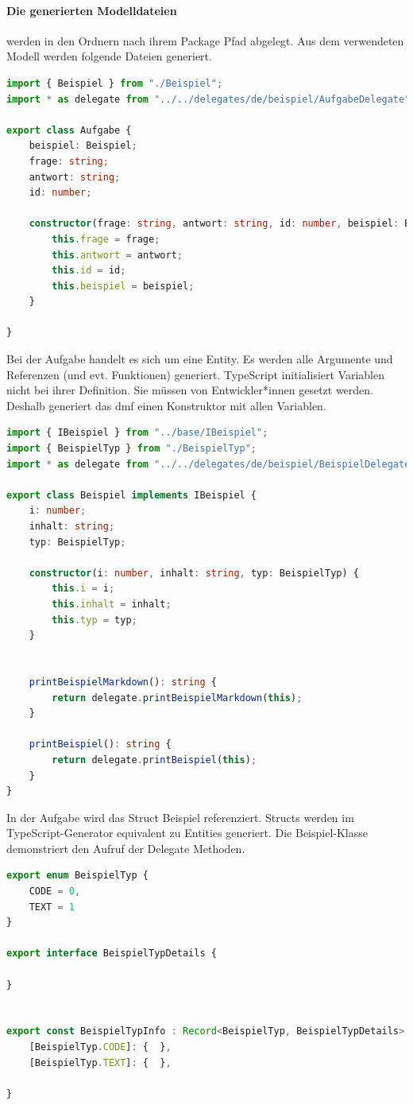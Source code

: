 \documentclass[./einleitung.tex]{subfiles}
\begin{document}
    \paragraph{Die generierten Modelldateien} werden in den Ordnern nach ihrem Package Pfad abgelegt.
    Aus dem verwendeten Modell werden folgende Dateien generiert.
    \begin{lstlisting}[language=Typescript,caption=Aufgabe.ts, label=lst:aufgabeTs]
import { Beispiel } from "./Beispiel";
import * as delegate from "../../delegates/de/beispiel/AufgabeDelegate";

export class Aufgabe {
    beispiel: Beispiel;
    frage: string;
    antwort: string;
    id: number;

    constructor(frage: string, antwort: string, id: number, beispiel: Beispiel) {
        this.frage = frage;
        this.antwort = antwort;
        this.id = id;
        this.beispiel = beispiel;
    }

}
    \end{lstlisting}
    Bei der Aufgabe handelt es sich um eine Entity.
    Es werden alle Argumente und Referenzen (und evt. Funktionen) generiert.
    TypeScript initialisiert Variablen nicht bei ihrer Definition.
    Sie müssen von Entwickler*innen gesetzt werden.
    Deshalb generiert das \acrshort{dmf} einen Konstruktor mit allen Variablen.
    \begin{lstlisting}[language=Typescript, caption=Beispiel.ts, label=lst:beispielTs]
import { IBeispiel } from "../base/IBeispiel";
import { BeispielTyp } from "./BeispielTyp";
import * as delegate from "../../delegates/de/beispiel/BeispielDelegate";

export class Beispiel implements IBeispiel {
    i: number;
    inhalt: string;
    typ: BeispielTyp;

    constructor(i: number, inhalt: string, typ: BeispielTyp) {
        this.i = i;
        this.inhalt = inhalt;
        this.typ = typ;
    }


    printBeispielMarkdown(): string {
        return delegate.printBeispielMarkdown(this);
    }

    printBeispiel(): string {
        return delegate.printBeispiel(this);
    }
}
    \end{lstlisting}
    In der Aufgabe wird das Struct Beispiel referenziert.
    Structs werden im TypeScript-Generator equivalent zu Entities generiert.
    Die Beispiel-Klasse demonstriert den Aufruf der Delegate Methoden.
    \begin{lstlisting}[language=Typescript, caption=BeispielTyp.ts, label=lst:beispielTypTs]
export enum BeispielTyp {
    CODE = 0,
    TEXT = 1
}

export interface BeispielTypDetails {

}


export const BeispielTypInfo : Record<BeispielTyp, BeispielTypDetails> = {
    [BeispielTyp.CODE]: {  },
    [BeispielTyp.TEXT]: {  },

}
    \end{lstlisting}
\end{document}

